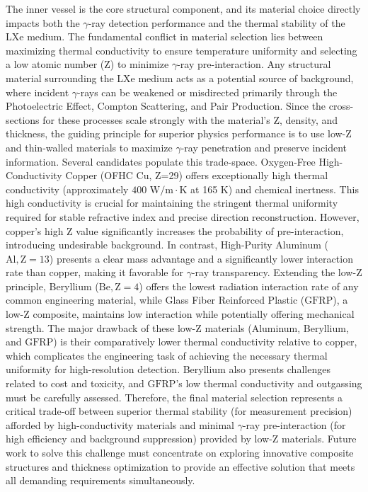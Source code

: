 \documentclass{aastex701}
\begin{document}
The inner vessel is the core structural component, and its material choice directly impacts both the $\gamma$-ray detection performance and the thermal stability of the LXe medium. The fundamental conflict in material selection lies between maximizing thermal conductivity to ensure temperature uniformity and selecting a low atomic number ($\text{Z}$) to minimize $\gamma$-ray pre-interaction. Any structural material surrounding the LXe medium acts as a potential source of background, where incident $\gamma$-rays can be weakened or misdirected primarily through the Photoelectric Effect, Compton Scattering, and Pair Production. Since the cross-sections for these processes scale strongly with the material's Z, density, and thickness, the guiding principle for superior physics performance is to use low-$\text{Z}$ and thin-walled materials to maximize $\gamma$-ray penetration and preserve incident information. Several candidates populate this trade-space. Oxygen-Free High-Conductivity Copper (OFHC Cu, Z=29) offers exceptionally high thermal conductivity (approximately $400\text{ W/m}\cdot\text{K}$ at 165 K) and chemical inertness. This high conductivity is crucial for maintaining the stringent thermal uniformity required for stable refractive index and precise direction reconstruction. However, copper’s high $\text{Z}$ value significantly increases the probability of pre-interaction, introducing undesirable background. In contrast, High-Purity Aluminum ($\text{Al}, \text{Z}=13$) presents a clear mass advantage and a significantly lower interaction rate than copper, making it favorable for $\gamma$-ray transparency. Extending the low-$\text{Z}$ principle, Beryllium ($\text{Be}, \text{Z}=4$) offers the lowest radiation interaction rate of any common engineering material, while Glass Fiber Reinforced Plastic ($\text{GFRP}$), a low-$\text{Z}$ composite, maintains low interaction while potentially offering mechanical strength. The major drawback of these low-$\text{Z}$ materials (Aluminum, Beryllium, and $\text{GFRP}$) is their comparatively lower thermal conductivity relative to copper, which complicates the engineering task of achieving the necessary thermal uniformity for high-resolution detection. Beryllium also presents challenges related to cost and toxicity, and $\text{GFRP}$’s low thermal conductivity and outgassing must be carefully assessed. Therefore, the final material selection represents a critical trade-off between superior thermal stability (for measurement precision) afforded by high-conductivity materials and minimal $\gamma$-ray pre-interaction (for high efficiency and background suppression) provided by low-$\text{Z}$ materials. Future work to solve this challenge must concentrate on exploring innovative composite structures and thickness optimization to provide an effective solution that meets all demanding requirements simultaneously.
\end{document}
